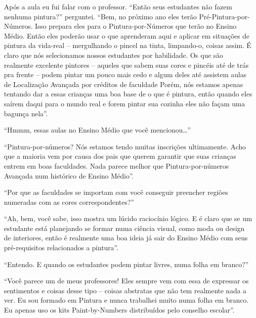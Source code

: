 \documentclass[a4paper,oneside,12pt,notitlepage]{article}
\begin{document}
Após a aula eu fui falar com o professor.
``Então seus estudantes não fazem nenhuma pintura?''
perguntei.
``Bem, no próximo ano eles terão Pré-Pintura-por-Números.
Isso prepara eles para o Pintura-por-Números que terão no Ensino Médio.
Então eles poderão usar o que aprenderam aqui e aplicar em situações de pintura da vida-real -- mergulhando o pincel na tinta, limpando-o, coisas assim.
É claro que nós selecionamos nossos estudantes por habilidade.
Os que são realmente excelente pintores -- aqueles que sabem suas cores e pincéis até de trás pra frente -- podem pintar um pouco mais cedo e algum deles até assistem aulas de Localização Avançada por créditos de faculdade
Porém, nós estamos apenas tentando dar a essas crianças uma boa base de o que é pintura, então quando eles saírem daqui para o mundo real e forem pintar sua cozinha eles não façam uma bagunça nela''.

``Hmmm, essas aulas no Ensino Médio que você mencionou\ldots{}''

``Pintura-por-números?
Nós estamos tendo muitas inscrições ultimamente.
Acho que a maioria vem por causa dos pais que querem garantir que suas crianças entrem em boas faculdades.
Nada parece melhor que Pintura-por-números Avançada num histórico de Ensino Médio''.

``Por que as faculdades se importam com você conseguir preencher regiões numeradas com as cores correspondentes?''

``Ah, bem, você sabe, isso mostra um lúcido raciocínio lógico.
E é claro que se um estudante está planejando se formar numa ciência visual, como moda ou design de interiores, então é realmente uma boa ideia já sair do Ensino Médio com seus pré-requisitos relacionados a pintura''.

``Entendo.
E quando os estudantes podem pintar livres, numa folha em branco?''

``Você parece um de meus professores!
Eles sempre vem com essa de expressar os sentimentos e coisas desse tipo -- coisas abstratas que não tem realmente nada a ver.
Eu sou formado em Pintura e nunca trabalhei muito numa folha em branco.
Eu apenas uso os kits Paint-by-Numbers distribuídos pelo conselho escolar''.
\end{document}
